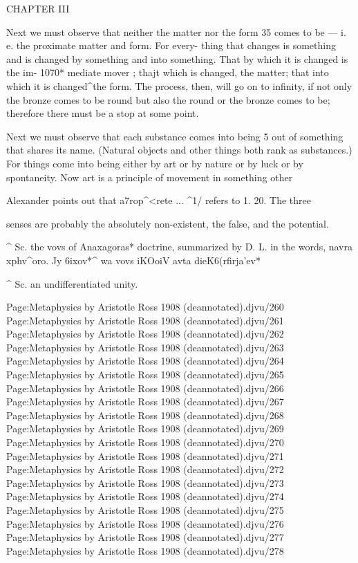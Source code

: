 CHAPTER III

Next we must observe that neither the matter nor the form 35
comes to be — i. e. the proximate matter and form. For every-
thing that changes is something and is changed by something
and into something. That by which it is changed is the im- 1070*
mediate mover ; thajt which is changed, the matter; that into
which it is changed\textasciicircum{}the form. The process, then, will go on to
infinity, if not only the bronze comes to be round but also the
round or the bronze comes to be; therefore there must be
a stop at some point.

Next we must observe that each substance comes into being 5
out of something that shares its name. (Natural objects and
other things both rank as substances.) For things come into
being either by art or by nature or by luck or by spontaneity.
Now art is a principle of movement in something other

Alexander points out that a7rop\textasciicircum{}<rete ... \textasciicircum{}1/ refers to 1. 20. The three

senses are probably the absolutely non-existent, the false, and the
potential.

\textasciicircum{} Sc. the vovs of Anaxagoras* doctrine, summarized by D. L. in the
words, navra xphv\textasciicircum{}oro. Jy 6ixov*\textasciicircum{} wa vovs iKOoiV avta dieK6(rfirja'ev*

\textasciicircum{} Sc. an undifferentiated unity.

Page:Metaphysics by Aristotle Ross 1908 (deannotated).djvu/260 Page:Metaphysics by Aristotle Ross 1908 (deannotated).djvu/261 Page:Metaphysics by Aristotle Ross 1908 (deannotated).djvu/262 Page:Metaphysics by Aristotle Ross 1908 (deannotated).djvu/263 Page:Metaphysics by Aristotle Ross 1908 (deannotated).djvu/264 Page:Metaphysics by Aristotle Ross 1908 (deannotated).djvu/265 Page:Metaphysics by Aristotle Ross 1908 (deannotated).djvu/266 Page:Metaphysics by Aristotle Ross 1908 (deannotated).djvu/267 Page:Metaphysics by Aristotle Ross 1908 (deannotated).djvu/268 Page:Metaphysics by Aristotle Ross 1908 (deannotated).djvu/269 Page:Metaphysics by Aristotle Ross 1908 (deannotated).djvu/270 Page:Metaphysics by Aristotle Ross 1908 (deannotated).djvu/271 Page:Metaphysics by Aristotle Ross 1908 (deannotated).djvu/272 Page:Metaphysics by Aristotle Ross 1908 (deannotated).djvu/273 Page:Metaphysics by Aristotle Ross 1908 (deannotated).djvu/274 Page:Metaphysics by Aristotle Ross 1908 (deannotated).djvu/275 Page:Metaphysics by Aristotle Ross 1908 (deannotated).djvu/276 Page:Metaphysics by Aristotle Ross 1908 (deannotated).djvu/277 Page:Metaphysics by Aristotle Ross 1908 (deannotated).djvu/278

